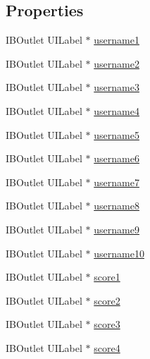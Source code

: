 \subsection*{Properties}
\begin{DoxyCompactItemize}
\item 
I\+B\+Outlet U\+I\+Label $\ast$ \hyperlink{interfaceleader_board_view_controller_a39cb9bfd66f9b88ddd21d97a99b6f768}{username1}
\item 
I\+B\+Outlet U\+I\+Label $\ast$ \hyperlink{interfaceleader_board_view_controller_aecd8cc766919cd08af8b076b0e0998b9}{username2}
\item 
I\+B\+Outlet U\+I\+Label $\ast$ \hyperlink{interfaceleader_board_view_controller_a7ea8414329d2524315087771077af677}{username3}
\item 
I\+B\+Outlet U\+I\+Label $\ast$ \hyperlink{interfaceleader_board_view_controller_a0ab5cf52855ddf63300e12288457ae3e}{username4}
\item 
I\+B\+Outlet U\+I\+Label $\ast$ \hyperlink{interfaceleader_board_view_controller_a4e9d8329502df735180914f6a0755306}{username5}
\item 
I\+B\+Outlet U\+I\+Label $\ast$ \hyperlink{interfaceleader_board_view_controller_a13d3ddc8cb38fbf791ca2cdf37e307c1}{username6}
\item 
I\+B\+Outlet U\+I\+Label $\ast$ \hyperlink{interfaceleader_board_view_controller_ac89835f3ea5698e58699560231853f41}{username7}
\item 
I\+B\+Outlet U\+I\+Label $\ast$ \hyperlink{interfaceleader_board_view_controller_a363f5ec11d713e9253899eda852a146c}{username8}
\item 
I\+B\+Outlet U\+I\+Label $\ast$ \hyperlink{interfaceleader_board_view_controller_a944c15dbf05091d2385434f3f9155205}{username9}
\item 
I\+B\+Outlet U\+I\+Label $\ast$ \hyperlink{interfaceleader_board_view_controller_affd33ec921f12f27e753b8b210987c0f}{username10}
\item 
I\+B\+Outlet U\+I\+Label $\ast$ \hyperlink{interfaceleader_board_view_controller_ae502354b7354aa7a23efe50fbc166c72}{score1}
\item 
I\+B\+Outlet U\+I\+Label $\ast$ \hyperlink{interfaceleader_board_view_controller_aa27b7cbd28516b92106c885223470744}{score2}
\item 
I\+B\+Outlet U\+I\+Label $\ast$ \hyperlink{interfaceleader_board_view_controller_ae72b9cb18e827f4d980f777014d4ef8d}{score3}
\item 
I\+B\+Outlet U\+I\+Label $\ast$ \hyperlink{interfaceleader_board_view_controller_ae2b293087baf3527a2d276663c24cc05}{score4}

\end{DoxyCompactItemize}
